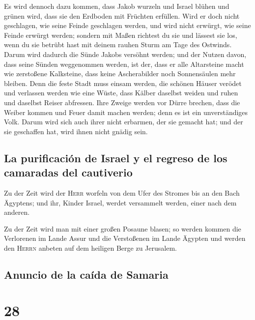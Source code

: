  Es wird dennoch dazu kommen, dass Jakob wurzeln und
Israel blühen und grünen wird, dass sie den Erdboden mit Früchten
erfüllen.  Wird er doch nicht geschlagen, wie seine Feinde
geschlagen werden, und wird nicht erwürgt, wie seine Feinde erwürgt
werden;  sondern mit Maßen richtest du sie und lässest sie
los, wenn du sie betrübt hast mit deinem rauhen Sturm am Tage des
Ostwinds.  Darum wird dadurch die Sünde Jakobs versöhnt
werden; und der Nutzen davon, dass seine Sünden weggenommen werden, ist
der, dass er alle Altarsteine macht wie zerstoßene Kalksteine, dass
keine Ascherabilder noch Sonnensäulen mehr bleiben.  Denn
die feste Stadt muss einsam werden, die schönen Häuser verödet und
verlassen werden wie eine Wüste, dass Kälber daselbst weiden und ruhen
und daselbst Reiser abfressen.  Ihre Zweige werden vor
Dürre brechen, dass die Weiber kommen und Feuer damit machen werden;
denn es ist ein unverständiges Volk. Darum wird sich auch ihrer nicht
erbarmen, der sie gemacht hat; und der sie geschaffen hat, wird ihnen
nicht gnädig sein.

\hypertarget{la-purificaciuxf3n-de-israel-y-el-regreso-de-los-camaradas-del-cautiverio}{%
\subsection{La purificación de Israel y el regreso de los camaradas del
cautiverio}\label{la-purificaciuxf3n-de-israel-y-el-regreso-de-los-camaradas-del-cautiverio}}

 Zu der Zeit wird der \textsc{Herr} worfeln von dem Ufer
des Stromes bis an den Bach Ägyptens; und ihr, Kinder Israel, werdet
versammelt werden, einer nach dem anderen.

 Zu der Zeit wird man mit einer großen Posaune blasen; so
werden kommen die Verlorenen im Lande Assur und die Verstoßenen im Lande
Ägypten und werden den \textsc{Herrn} anbeten auf dem heiligen Berge zu
Jerusalem.

\hypertarget{anuncio-de-la-cauxedda-de-samaria}{%
\subsection{Anuncio de la caída de
Samaria}\label{anuncio-de-la-cauxedda-de-samaria}}

\hypertarget{section-27}{%
\section{28}\label{section-27}}

